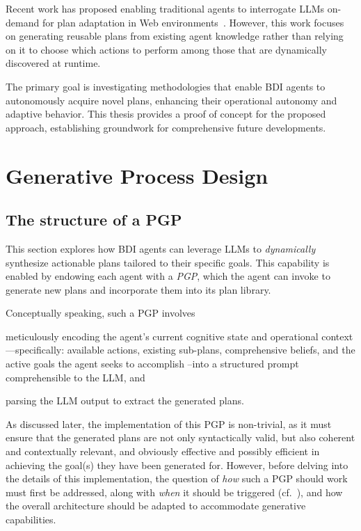 \documentclass[12pt,a4paper,openright,twoside]{book}
\begin{document}
Recent work has proposed enabling traditional agents to interrogate \acp{LLM} on-demand for plan adaptation in Web environments~\cite{schmid2024kgswc}. 
%
However, this work focuses on generating reusable plans from existing agent knowledge rather than relying on it to choose which actions to perform among those that are dynamically discovered at runtime.

The primary goal is investigating methodologies that enable \ac{BDI} agents to autonomously acquire novel plans, enhancing their operational autonomy and adaptive behavior. 
%
This thesis provides a proof of concept for the proposed approach, establishing groundwork for comprehensive future developments.

\chapter{Generative Process Design}\label{sec:design}

\section{The structure of a PGP}\label{sec:pgp-structure}

This section explores how \ac{BDI} agents can leverage \acp{LLM} to \emph{dynamically} synthesize actionable plans tailored to their specific goals. 
%
This capability is enabled by endowing each agent with a \emph{\acf{PGP}}, which the agent can invoke to generate new plans and incorporate them into its plan library.

Conceptually speaking, such a \ac{PGP} involves
%
\begin{inlinelist}
    \item meticulously encoding the agent’s current cognitive state and operational context---specifically: available actions, existing sub-plans, comprehensive beliefs, and the active goals the agent seeks to accomplish --into a structured prompt comprehensible to the \ac{LLM}, and \item parsing the \ac{LLM} output to extract the generated plans.
\end{inlinelist}
%
As discussed later, the implementation of this \ac{PGP} is non-trivial, as it must ensure that the generated plans are not only syntactically valid, but also coherent and contextually relevant, and obviously effective and possibly efficient in achieving the goal(s) they have been generated for.
%
However, before delving into the details of this implementation, the question of \emph{how} such a \ac{PGP} should work must first be addressed, along with \emph{when} it should be triggered (cf.~), and how the overall \agentspeak{} architecture should be adapted to accommodate generative capabilities.
\end{document}

